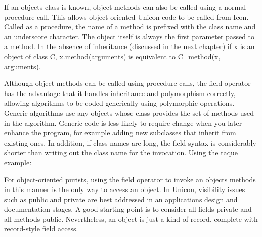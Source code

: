 
If an object{\textquotesingle}s class is known, object methods can also
be called using a normal procedure call. This allows object oriented
Unicon code to be called from Icon. Called as a procedure, the name of
a method is prefixed with the class name and an underscore character.
The object itself is always the first parameter passed to a method. In
the absence of inheritance (discussed in the next chapter) if
\textsf{x} is an object of class \textsf{C},
\textsf{x.method(arguments)} is equivalent to \textsf{C\_method(x,
arguments)}.

Although object methods can be called using procedure calls, the field
operator has the advantage that it handles inheritance and polymorphism
correctly, allowing algorithms to be coded generically using
polymorphic operations. Generic algorithms use any objects whose class
provides the set of methods used in the algorithm. Generic code is less
likely to require change when you later enhance the program, for
example adding new subclasses that inherit from
existing ones. In addition, if class names are long, the field syntax
is considerably shorter than writing out the class name for the
invocation. Using the taque example: 


For object-oriented purists, using the field operator to invoke an
object{\textquotesingle}s methods in this manner is the only way to
access an object. In Unicon, visibility issues such as
{\textquotedbl}public{\textquotedbl} and
{\textquotedbl}private{\textquotedbl} are best addressed in an
application{\textquotesingle}s design and documentation stages. A good
starting point is to consider all fields
{\textquotedbl}private{\textquotedbl} and all methods
{\textquotedbl}public{\textquotedbl}. Nevertheless, an object is just a
kind of record, complete with record-style field access.


